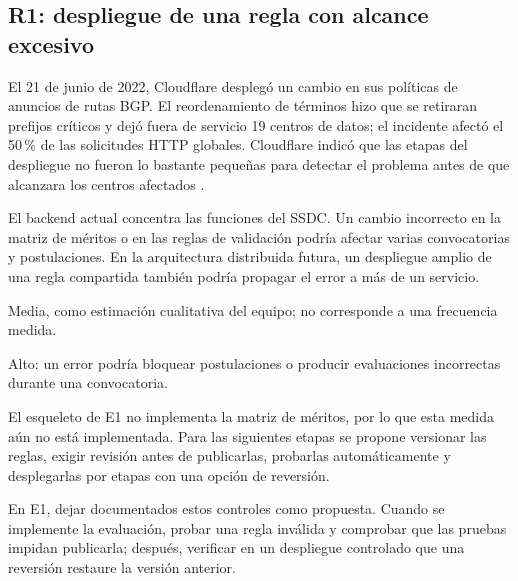 \subsection{R1: despliegue de una regla con alcance excesivo}

\begin{description}[leftmargin=!,labelwidth=4.2cm,style=nextline]
  \item[Incidente de origen]
    El 21 de junio de 2022, Cloudflare desplegó un cambio en sus políticas de anuncios de rutas BGP. El reordenamiento de términos hizo que se retiraran prefijos críticos y dejó fuera de servicio 19 centros de datos; el incidente afectó el 50\,\% de las solicitudes HTTP globales. Cloudflare indicó que las etapas del despliegue no fueron lo bastante pequeñas para detectar el problema antes de que alcanzara los centros afectados \cite{cloudflare2022outage}.

  \item[Relación con el SSDC]
    El backend actual concentra las funciones del SSDC. Un cambio incorrecto en la matriz de méritos o en las reglas de validación podría afectar varias convocatorias y postulaciones. En la arquitectura distribuida futura, un despliegue amplio de una regla compartida también podría propagar el error a más de un servicio.

  \item[Probabilidad]
    Media, como estimación cualitativa del equipo; no corresponde a una frecuencia medida.

  \item[Impacto]
    Alto: un error podría bloquear postulaciones o producir evaluaciones incorrectas durante una convocatoria.

  \item[Medida propuesta]
    El esqueleto de E1 no implementa la matriz de méritos, por lo que esta medida aún no está implementada. Para las siguientes etapas se propone versionar las reglas, exigir revisión antes de publicarlas, probarlas automáticamente y desplegarlas por etapas con una opción de reversión.

  \item[Verificación]
    En E1, dejar documentados estos controles como propuesta. Cuando se implemente la evaluación, probar una regla inválida y comprobar que las pruebas impidan publicarla; después, verificar en un despliegue controlado que una reversión restaure la versión anterior.
\end{description}
